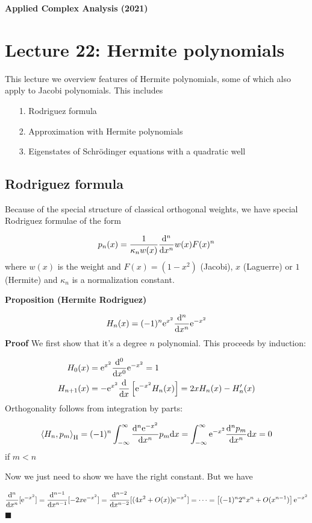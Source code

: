 \documentclass[12pt,a4paper]{article}
\def\D{ {\rm d} }
\def\E{ {\rm e} }
\def\ip<#1>{\left\langle{#1}\right\rangle}
\def\dx{\D x}
\begin{document}
\textbf{Applied Complex Analysis (2021)}

\section{Lecture 22: Hermite polynomials}
This lecture we overview features of Hermite polynomials, some of which also apply to Jacobi polynomials.  This includes

\begin{itemize}
\item[1. ] Rodriguez formula


\item[2. ] Approximation with Hermite polynomials


\item[3. ] Eigenstates of Schrödinger equations with a quadratic well

\end{itemize}
\subsection{Rodriguez formula}
Because of the special structure of classical orthogonal weights, we have special Rodriguez formulae of the form

\[
 p_n(x) = {1 \over \kappa_n w(x)} {\D^n \over \dx^n} w(x) F(x)^n
\]
where $w(x)$ is the weight and $F(x) = (1-x^2)$ (Jacobi), $x$ (Laguerre) or $1$ (Hermite) and $\kappa_n$ is a normalization constant.

\textbf{Proposition (Hermite Rodriguez)}

\[
H_n(x)= (-1)^n \E^{x^2}  {\D^n \over \dx^n} \E^{-x^2}
\]
\textbf{Proof} We first show that it's a degree $n$ polynomial. This proceeds by induction:


\begin{align*}
 H_0(x) &= \E^{x^2} {\D^0 \over \dx^0}\E^{-x^2} = 1 \\
 H_{n+1}(x) &= -\E^{x^2}{\D \over \dx}\left[\E^{-x^2} H_{n}(x)\right] =   2x H_{n}(x) - H_n'(x)
\end{align*}
Orthogonality follows from integration by parts:

\[
\ip<H_n, p_m>_{\rm H} = (-1)^n \int_{-\infty}^{\infty}  {\D^n  \E^{-x^2} \over \dx^n} p_m \dx = \int_{-\infty}^{\infty}  \E^{-x^2} {\D^n p_m \over \dx^n} \dx = 0
\]
if $m < n$

Now we just need to show we have the right constant. But we have

\[
 {\D^n \over \dx^n}[\E^{-x^2}] =  {\D^{n-1} \over \dx^{n-1}}[-2x \E^{-x^2}] = {\D^{n-2} \over \dx^{n-2}}[(4x^2 + O(x)) \E^{-x^2}] = \cdots = \left[(-1)^n 2^n x^n + O(x^{n-1})\right]\E^{-x^2}
\]
\ensuremath{\blacksquare}
\end{document}
